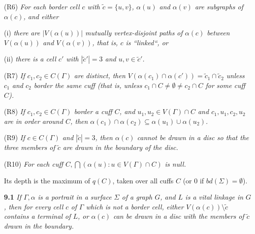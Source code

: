 \hspace*{12pt}(R6) \textit{For each border cell $c$ with $\tilde{c} = \{u, v\}$, $\alpha(u)$ and $\alpha(v)$ are subgraphs of $\alpha(c)$, and either}

\hspace*{12pt}(i) \textit{there are $|V(\alpha(u))|$ mutually vertex-disjoint paths of $\alpha(c)$ between $V(\alpha(u))$ and $V(\alpha(v))$, that is, $c$ is ``linked``, or}

\hspace*{12pt}(ii) \textit{there is a cell $c'$ with $|\tilde{c}'| = 3$ and $u, v \in \tilde{c}'$.}

\hspace*{12pt}(R7) \textit{If $c_1, c_2 \in C(\Gamma)$ are distinct, then $V(\alpha(c_1) \cap \alpha(c')) = \tilde{c}_1 \cap \tilde{c}_2$ unless $c_1$ and $c_2$ border the same cuff (that is, unless $c_1 \cap C \ne \emptyset \ne c_2 \cap C$ for some cuff $C$).}

\hspace*{12pt}(R8) \textit{If $c_1, c_2 \in C(\Gamma)$ border a cuff $C$, and $u_1, u_2 \in V(\Gamma) \cap C$ and $c_1, u_1, c_2, u_2$ are in order around $C$, then $\alpha(c_1) \cap \alpha(c_2) \subseteq \alpha(u_1) \cup \alpha(u_2)$.}

\hspace*{12pt}(R9) \textit{If $c \in C(\Gamma)$ and $|\tilde{c}| = 3$, then $\alpha(c)$ cannot be drawn in a disc so that the three members of $\tilde{c}$ are drawn in the boundary of the disc.}

\hspace*{12pt}(R10) \textit{For each cuff $C, \bigcap(\alpha(u) : u \in V(\Gamma) \cap C)$ is null.}

Its depth is the maximum of $q(C)$, taken over all cuffs $C$ (or $0$ if $bd(\Sigma) = \emptyset$).

\textbf{9.1} \textit{If $\Gamma, \alpha$ is a portrait in a surface $\Sigma$ of a graph $G$, and $L$ is a vital linkage in $G$, then for every cell $c$ of $\Gamma$ which is not a border cell, either $V(\alpha(c)) \setminus \tilde{c}$ contains a terminal of $L$, or $\alpha(c)$ can be drawn in a disc with the members of $\tilde{c}$ drawn in the boundary.}

